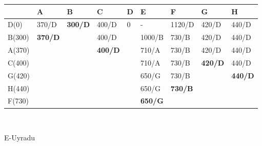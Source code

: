 \documentclass[12pt]{article}
\begin{document}
\begin{enumerate}
\begin{center}
\begin{tabular}{|l|llll|l|lll}
\hline
 & \multicolumn{1}{l|}{A} & \multicolumn{1}{l|}{B} & \multicolumn{1}{l|}{C} & D & E & \multicolumn{1}{l|}{F} & \multicolumn{1}{l|}{G} & \multicolumn{1}{l|}{H} \\ \hline
D(0) & \multicolumn{1}{l|}{370/D} & \multicolumn{1}{l|}{\textbf{300/D}} & \multicolumn{1}{l|}{400/D} & 0 & - & \multicolumn{1}{l|}{1120/D} & \multicolumn{1}{l|}{420/D} & \multicolumn{1}{l|}{440/D} \\ \hline
B(300) & \multicolumn{1}{l|}{\textbf{370/D}} & \multicolumn{1}{l|}{\textbf{}} & \multicolumn{1}{l|}{400/D} &  & 1000/B & \multicolumn{1}{l|}{730/B} & \multicolumn{1}{l|}{420/D} & \multicolumn{1}{l|}{440/D} \\ \cline{1-2} \cline{4-4} \cline{6-9} 
A(370) &  & \multicolumn{1}{l|}{} & \multicolumn{1}{l|}{\textbf{400/D}} & \textbf{} & 710/A & \multicolumn{1}{l|}{730/B} & \multicolumn{1}{l|}{420/D} & \multicolumn{1}{l|}{440/D} \\ \cline{1-1} \cline{4-4} \cline{6-9} 
C(400) & \textbf{} &  &  &  & 710/A & \multicolumn{1}{l|}{730/B} & \multicolumn{1}{l|}{\textbf{420/D}} & \multicolumn{1}{l|}{440/D} \\ \cline{1-1} \cline{6-9} 
G(420) &  &  &  &  & 650/G & \multicolumn{1}{l|}{730/B} & \multicolumn{1}{l|}{\textbf{}} & \multicolumn{1}{l|}{\textbf{440/D}} \\ \cline{1-1} \cline{6-7} \cline{9-9} 
H(440) &  &  &  &  & 650/G & \multicolumn{1}{l|}{\textbf{730/B}} &  &  \\ \cline{1-1} \cline{6-7}
F(730) & \textbf{} &  &  &  & \textbf{650/G} & \textbf{} &  &  \\ \cline{1-1} \cline{6-6}
\end{tabular}
\\
      \vspace{0.5cm}
      
          E-Uyradu
          

\end{center}
\end{enumerate}
\end{document}
